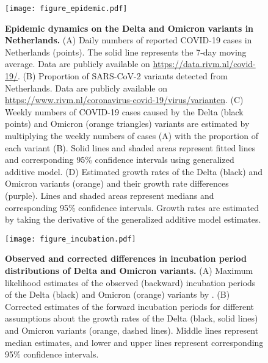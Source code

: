 \documentclass[12pt]{article}
\begin{document}
\begin{figure}[!th]
\texttt{[image: figure\_epidemic.pdf]}
\caption{
\textbf{Epidemic dynamics on the Delta and Omicron variants in Netherlands.}
(A) Daily numbers of reported COVID-19 cases in Netherlands (points).
The solid line represents the 7-day moving average.
Data are publicly available on \url{https://data.rivm.nl/covid-19/}.
(B) Proportion of SARS-CoV-2 variants detected from Netherlands. Data are publicly available on \url{https://www.rivm.nl/coronavirus-covid-19/virus/varianten}.
(C) Weekly numbers of COVID-19 cases caused by the Delta (black points) and Omicron (orange triangles) variants are estimated by multiplying the weekly numbers of cases (A) with the proportion of each variant (B).
Solid lines and shaded areas represent fitted lines and corresponding 95\% confidence intervals using generalized additive model.
(D) Estimated growth rates of the Delta (black) and Omicron variants (orange) and their growth rate differences (purple).
Lines and shaded areas represent medians and corresponding 95\% confidence intervals.
Growth rates are estimated by taking the derivative of the generalized additive model estimates.
}
\end{figure}


\pagebreak

\begin{figure}[!th]
\texttt{[image: figure\_incubation.pdf]}
\caption{
\textbf{Observed and corrected differences in incubation period distributions of Delta and Omicron variants.}
(A) Maximum likelihood estimates of the observed (backward) incubation periods of the Delta (black) and Omicron (orange) variants by \cite{backer2021omicron}.
(B) Corrected estimates of the forward incubation periods for different assumptions about the growth rates of the Delta (black, solid lines) and Omicron variants (orange, dashed lines).
Middle lines represent median estimates, and lower and upper lines represent corresponding 95\% confidence intervals.
}
\end{figure}

\pagebreak
\end{document}
